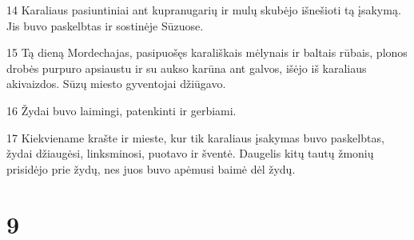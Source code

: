 \par 14 Karaliaus pasiuntiniai ant kupranugarių ir mulų skubėjo išnešioti tą įsakymą. Jis buvo paskelbtas ir sostinėje Sūzuose. 
\par 15 Tą dieną Mordechajas, pasipuošęs karališkais mėlynais ir baltais rūbais, plonos drobės purpuro apsiaustu ir su aukso karūna ant galvos, išėjo iš karaliaus akivaizdos. Sūzų miesto gyventojai džiūgavo. 
\par 16 Žydai buvo laimingi, patenkinti ir gerbiami. 
\par 17 Kiekviename krašte ir mieste, kur tik karaliaus įsakymas buvo paskelbtas, žydai džiaugėsi, linksminosi, puotavo ir šventė. Daugelis kitų tautų žmonių prisidėjo prie žydų, nes juos buvo apėmusi baimė dėl žydų.



\chapter{9}

